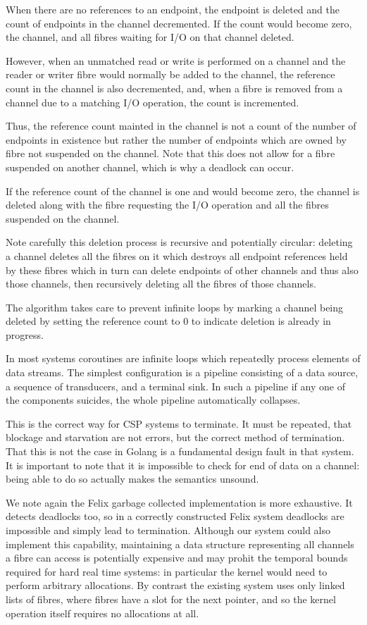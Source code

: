 \documentclass[oneside]{book}
\begin{document}
When there are no references to an endpoint, the endpoint is
deleted and the count of endpoints in the channel decremented.
If the count would become zero, the channel, and all fibres
waiting for I/O on that channel deleted.

However, when an unmatched read or write is performed on a channel
and the reader or writer fibre would normally be added to the channel,
the reference count in the channel is also decremented, and, when a
fibre is removed from a channel due to a matching I/O operation,
the count is incremented.

Thus, the reference count mainted in the channel is not a count
of the number of endpoints in existence but rather the number
of endpoints which are owned by fibre not suspended on the channel.
Note that this does not allow for a fibre suspended on another channel,
which is why a deadlock can occur.

If the reference count of the channel is one and would become
zero, the channel is deleted along with the fibre requesting
the I/O operation and all the fibres suspended on the channel.

Note carefully this deletion process is recursive and potentially
circular: deleting a channel deletes all the fibres on it which
destroys all endpoint references held by these fibres which
in turn can delete endpoints of other channels and thus also
those channels, then recursively deleting all the fibres
of those channels.

The algorithm takes care to prevent infinite loops by marking
a channel being deleted by setting the reference count to 0
to indicate deletion is already in progress.

In most systems coroutines are infinite loops which repeatedly
process elements of data streams. The simplest configuration is
a pipeline consisting of a data source, a sequence of transducers,
and a terminal sink. In such a pipeline if any one of the components
suicides, the whole pipeline automatically collapses. 

This is the correct way for CSP systems to terminate. It must be repeated,
that blockage and starvation are not errors, but the correct method of termination.
That this is not the case in Golang is a fundamental design fault in that
system. It is important to note that it is impossible to check for
end of data on a channel: being able to do so actually makes the semantics
unsound.

We note again the Felix garbage collected implementation is more exhaustive.
It detects deadlocks too, so in a correctly constructed Felix system
deadlocks are impossible and simply lead to termination. Although our
system could also implement this capability, maintaining a data structure
representing all channels a fibre can access is potentially expensive
and may prohit the temporal bounds required for hard real time systems:
in particular the kernel would need to perform arbitrary allocations.
By contrast the existing system uses only linked lists of fibres,
where fibres have a slot for the next pointer, and so the kernel operation
itself requires no allocations at all.
\end{document}
